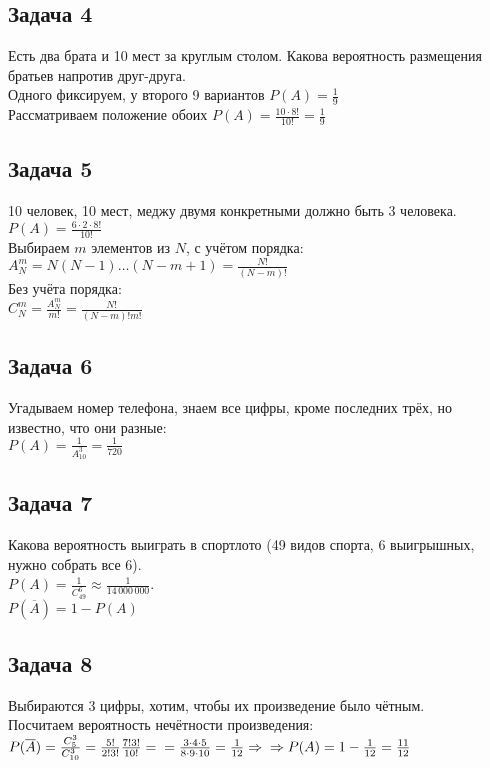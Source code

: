\documentclass[12pt, a4paper]{article}
\begin{document}
    \subsection*{Задача 4}
    Есть два брата и 10 мест за круглым столом. Какова вероятность 
    размещения братьев напротив друг-друга.\\
    Одного фиксируем, у второго 9 вариантов $P(A) = \frac{1}{9}$\\
    Рассматриваем положение обоих $P(A) = \frac{10\cdot 8!}{10!} = \frac{1}{9}$
    \subsection*{Задача 5}
    10 человек, 10 мест, меджу двумя конкретными должно быть 3 человека.
    $P(A) = \frac{6\cdot 2\cdot 8!}{10!}$\\
    Выбираем $m$ элементов из $N$, с учётом порядка:\\
    $A^m_N = N(N - 1)\dots(N - m + 1) = \frac{N!}{(N - m)!}$\\
    Без учёта порядка:\\
    $C_N^m = \frac{A^m_N}{m!} = \frac{N!}{(N - m)!m!}$
    \subsection*{Задача 6}
    Угадываем номер телефона, знаем все цифры, кроме последних трёх, но известно, что они разные:\\
    $P(A) = \frac{1}{A^3_{10}} = \frac{1}{720}$
    \subsection*{Задача 7}
    Какова вероятность выиграть в спортлото (49 видов спорта, 6 выигрышных, нужно собрать все 6).\\
    $P(A) = \frac{1}{C^6_{49}}\approx \frac{1}{14\,000\,000}$.\\
    $P(\overline{A}) = 1 - P(A)$
    \subsection*{Задача 8}
    Выбираются 3 цифры, хотим, чтобы их произведение было чётным.\\
    Посчитаем вероятность нечётности произведения: $P(\overline{A}) = \frac{C_5^3}{C_{10}^3} = \frac{5!}{2!3!}\frac{7!3!}{10!} =\\
    = \frac{3\cdot 4\cdot 5}{8\cdot 9\cdot 10} = \frac{1}{12}\Rightarrow\\
    \Rightarrow P(A) = 1 - \frac{1}{12} = \frac{11}{12}$
\end{document}
